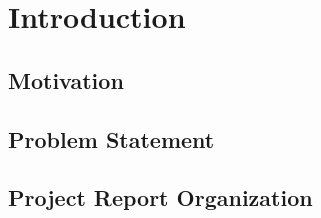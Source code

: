 \documentclass[../Report.tex]{subfiles}
\begin{document}
\chapter{Introduction}

\section{Motivation}

\section{Problem Statement}

\section{Project Report Organization}
\end{document}
